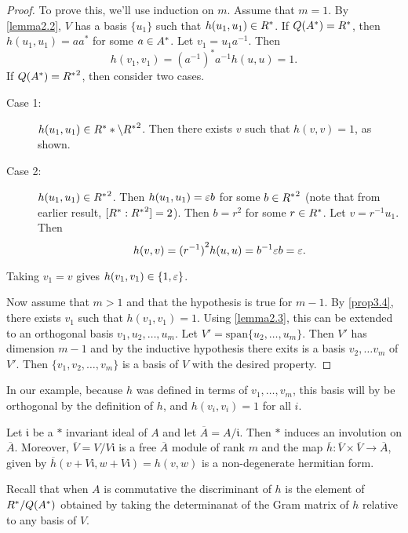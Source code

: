 \begin{proof}
To prove this, we'll use induction on $m$.
Assume that $m = 1$. By \cref{lemma2.2}, $V$ has a basis $\{u_1\}$ such that $h(u_1, u_1) \in R^*$.
If $Q(A^*) = R^*$, then $h(u_1, u_1) = a a^*$ for some $a \in A^*$.
Let $v_1 = u_1 a^{-1}$.
Then
\[
h(v_1, v_1) = (a^{-1})^* a^{-1} h(u, u) = 1.
\]
If $Q(A^*) = {R^*}^2$, then consider two cases.
\begin{description}
\item[Case 1:] $h(u_1, u_1) \in R^** \backslash {R^*}^2$.
Then there exists $v$ such that $h(v,v) = 1$, as shown.
\item[Case 2:] $h(u_1, u_1) \in {R^*}^2$.
Then $h(u_1, u_1) = \varepsilon b$ for some $b \in {R^*}^2$ (note that from earlier result, $[R^* : {R^*}^2] = 2$).
Then $b = r^2$ for some $r \in R^*$.
Let $v = r^{-1} u_1$. Then
\[
h(v, v) = {(r^{-1})}^2 h(u, u) = b^{-1} \varepsilon b = \varepsilon.
\]
\end{description}
Taking $v_1 = v$ gives $h(v_1, v_1) \in \{1, \varepsilon\}$.

Now assume that $m > 1$ and that the hypothesis is true for $m - 1$.
By \cref{prop3.4}, there exists $v_1$ such that $h(v_1, v_1) = 1$.
Using \cref{lemma2.3}, this can be extended to an orthogonal basis $v_1, u_2, \dotsc, u_m$.
Let $V' = \text{span} \{u_2, \dotsc, u_m \}$.
Then $V'$ has dimension $m - 1$ and by the inductive hypothesis there exits is a basis $v_2, \dotsc v_m$ of $V'$.
Then $\{v_1, v_2, \dotsc, v_m \}$ is a basis of $V$ with the desired property.
\end{proof}

\begin{example}\label{ex3.3}
In our example, because $h$ was defined in terms of $v_1, \dotsc, v_m$, this basis will by be orthogonal by the definition of $h$,
and $h(v_i, v_i) = 1$ for all $i$.
\end{example}

Let $\mathfrak{i}$ be a $*$ invariant ideal of $A$ and let $\overline{A} = A / \mathfrak{i}$.
Then $*$ induces an involution on $\overline{A}$.
Moreover, $\overline{V} = V / V \mathfrak{i}$ is a free $\overline{A}$ module of rank $m$ and the map $\overline{h}: \overline{V} \times \overline{V} \to \overline{A}$,
given by $\overline{h}(v + V \mathfrak{i}, w + V \mathfrak{i}) = h(v, w)$ is a non-degenerate hermitian form.

Recall that when $A$ is commutative the discriminant of $h$ is the element of $R^* / Q(A^*)$ obtained by taking the determinanat of the Gram matrix of $h$ relative to any basis of $V$.

